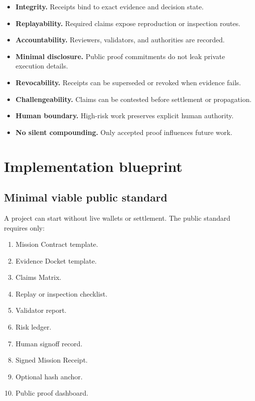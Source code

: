 \documentclass[11pt]{article}
\begin{document}
\begin{itemize}
  \item \textbf{Integrity.} Receipts bind to exact evidence and decision state.
  \item \textbf{Replayability.} Required claims expose reproduction or inspection routes.
  \item \textbf{Accountability.} Reviewers, validators, and authorities are recorded.
  \item \textbf{Minimal disclosure.} Public proof commitments do not leak private execution details.
  \item \textbf{Revocability.} Receipts can be superseded or revoked when evidence fails.
  \item \textbf{Challengeability.} Claims can be contested before settlement or propagation.
  \item \textbf{Human boundary.} High-risk work preserves explicit human authority.
  \item \textbf{No silent compounding.} Only accepted proof influences future work.
\end{itemize}

\section{Implementation blueprint}

\subsection{Minimal viable public standard}

A project can start without live wallets or settlement. The public standard requires only:

\begin{enumerate}
  \item Mission Contract template.
  \item Evidence Docket template.
  \item Claims Matrix.
  \item Replay or inspection checklist.
  \item Validator report.
  \item Risk ledger.
  \item Human signoff record.
  \item Signed Mission Receipt.
  \item Optional hash anchor.
  \item Public proof dashboard.
\end{enumerate}
\end{document}
